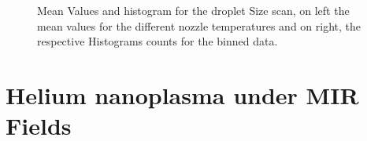 \begin{figure}[htb]

\captionsetup[subfloat]{farskip=2pt,captionskip=1pt}
\centering
\hspace*{\fill}%
\hspace*{\fill}%

\hspace*{\fill}%
\hspace*{\fill}%
\caption[NIR droplet size scan]{Mean Values and histogram for the droplet Size scan, on left the mean values for the different nozzle temperatures and on right, the respective Histograms counts for the binned data.}
\label{fig:NIR2}
\end{figure}



\section{Helium nanoplasma under MIR Fields }
 


